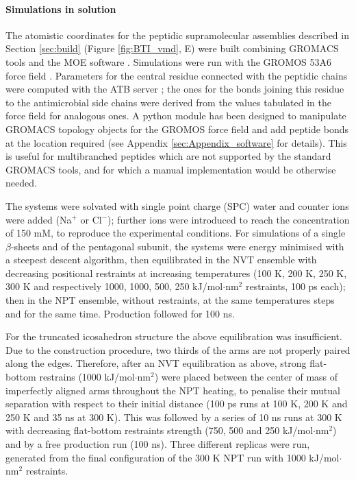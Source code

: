 \paragraph{Simulations in solution} The atomistic coordinates for the peptidic supramolecular assemblies described in Section \ref{sec:build} (Figure \ref{fig:BTI_vmd}, E) were built combining GROMACS tools and the MOE software \citep{moe}.
%
Simulations were run with the GROMOS 53A6 force field \citep{Oostenbrink2004}. Parameters for the central residue connected with the peptidic chains were computed with the ATB server \citep{Malde2011, Koziara2014}; the ones for the bonds joining this residue to the antimicrobial side chains were derived from the values tabulated in the force field for analogous ones.
%
A python module has been designed to manipulate GROMACS topology objects for the GROMOS force field and add peptide bonds at the location required (see Appendix \ref{sec:Appendix_software} for details). This is useful for multibranched peptides which are not supported by the standard GROMACS tools, and for which a manual implementation would be otherwise needed.

The systems were solvated with single point charge (SPC) water \citep{Berendsen1981} and counter ions were added (Na$^+$ or Cl$^-$); further ions were introduced to reach the concentration of 150 mM, to reproduce the experimental conditions.
%
For simulations of a single $\beta$-sheets and of the pentagonal subunit, the systems were energy minimised with a steepest descent algorithm, then equilibrated in the NVT ensemble with decreasing positional restraints at increasing temperatures (100 K, 200 K, 250 K, 300 K and respectively 1000, 1000, 500, 250 kJ/mol$\cdot$nm$^2$ restraints, 100 ps each); then in the NPT ensemble, without restraints, at the same temperatures steps and for the same time. Production followed for 100 ns.

For the truncated icosahedron structure the above equilibration was insufficient. Due to the construction procedure, two thirds of the arms are not properly paired along the edges.
%
Therefore, after an NVT equilibration as above, strong flat-bottom restrains (1000 kJ/mol$\cdot$nm$^2$) were placed between the center of mass of imperfectly aligned arms throughout the NPT heating, to penalise their mutual separation with respect to their initial distance (100 ps runs at 100 K, 200 K and 250 K and 35 ns at 300 K).
%
This was followed by a series of 10 ns runs at 300 K with decreasing flat-bottom restraints strength (750, 500 and 250 kJ/mol$\cdot$nm$^2$) and by a free production run (100 ns).
%
Three different replicas were run, generated from the final configuration of the 300 K NPT run with 1000 kJ/mol$\cdot$nm$^2$ restraints.

